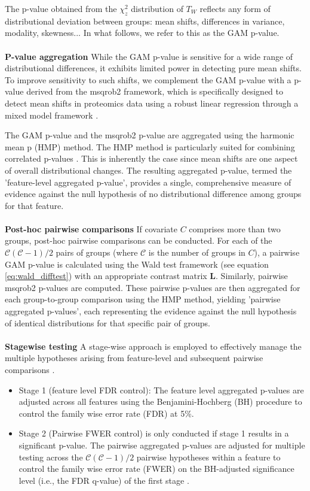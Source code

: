 The p-value obtained from the $\chi^2_z$ distribution of $T_W$ reflects any form of distributional deviation between groups: mean shifts, differences in variance, modality, skewness... In what follows, we refer to this as the GAM p-value.
\\
\\
\textbf{P-value aggregation}
While the GAM p-value is sensitive for a wide range of distributional differences, it exhibits limited power in detecting pure mean shifts. To improve sensitivity to such shifts, we complement the GAM p-value with a p-value derived from the msqrob2 framework, which is specifically designed to detect mean shifts in proteomics data using a robust linear regression through a mixed model framework \cite{msqrob}.\

The GAM p-value and the msqrob2 p-value are aggregated using the harmonic mean p (HMP) method. The HMP method is particularly suited for combining correlated p-values \cite{harmonicp}. This is inherently the case since mean shifts are one aspect of overall distributional changes.
The resulting aggregated p-value, termed the 'feature-level aggregated p-value', provides a single, comprehensive measure of evidence against the null hypothesis of no distributional difference among groups for that feature.
\\
\\
\textbf{Post-hoc pairwise comparisons}
If covariate $C$ comprises more than two groups, post-hoc pairwise comparisons can be conducted. For each of the $\mathcal{C}(\mathcal{C}-1)/2$ pairs of groups (where $\mathcal{C}$ is the number of groups in $C$), a pairwise GAM p-value is calculated using the Wald test framework (see equation \ref{eq:wald_difftest}) with an appropriate contrast matrix $\boldsymbol{L}$. Similarly, pairwise msqrob2 p-values are computed. These pairwise p-values are then aggregated for each group-to-group comparison using the HMP method, yielding 'pairwise aggregated p-values', each representing the evidence against the null hypothesis of identical distributions for that specific pair of groups.
\\
\\
\textbf{Stagewise testing}
A stage-wise approach is employed to effectively manage the multiple hypotheses arising from feature-level and subsequent pairwise comparisons \cite{stagewise_testing}.
\begin{itemize}
    \item Stage 1 (feature level FDR control): The feature level aggregated p-values are adjusted across all features using the Benjamini-Hochberg (BH) procedure to control the family wise error rate (FDR) at 5\%.
    
    \item Stage 2 (Pairwise FWER control) is only conducted if stage 1 results in a significant p-value. The pairwise aggregated p-values are adjusted for multiple testing across the $\mathcal{C}(\mathcal{C}-1)/2$ pairwise hypotheses within a feature to control the family wise error rate (FWER) on the BH-adjusted significance level (i.e., the FDR q-value) of the first stage \cite{stager}.
\end{itemize}

